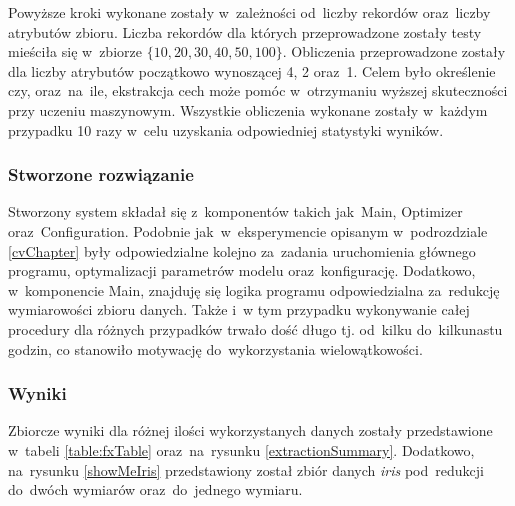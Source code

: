 Powyższe kroki wykonane zostały w~zależności od~liczby rekordów oraz~liczby atrybutów zbioru. Liczba rekordów dla których przeprowadzone zostały testy mieściła się w~zbiorze $ \{10, 20, 30, 40, 50, 100\} $. Obliczenia przeprowadzone zostały dla liczby atrybutów początkowo wynoszącej 4, 2 oraz~1. Celem było określenie czy, oraz~na~ile, ekstrakcja cech może pomóc w~otrzymaniu wyższej skuteczności przy uczeniu maszynowym. Wszystkie obliczenia wykonane zostały w~każdym przypadku 10 razy w~celu uzyskania odpowiedniej statystyki wyników.

\subsubsection{Stworzone rozwiązanie}
Stworzony system składał się z~komponentów takich jak~Main, Optimizer oraz~Configuration. Podobnie jak~w~eksperymencie opisanym w~podrozdziale \ref{cvChapter} były odpowiedzialne kolejno za~zadania uruchomienia głównego programu, optymalizacji parametrów modelu oraz~konfigurację. Dodatkowo, w~komponencie Main, znajduję się logika programu odpowiedzialna za~redukcję wymiarowości zbioru danych. Także i~w tym przypadku wykonywanie całej procedury dla różnych przypadków trwało dość długo tj. od~kilku do~kilkunastu godzin, co stanowiło motywację do~wykorzystania wielowątkowości.

\subsubsection{Wyniki}
Zbiorcze wyniki dla różnej ilości wykorzystanych danych zostały przedstawione w~tabeli \ref{table:fxTable} oraz~na~rysunku \ref{extractionSummary}. Dodatkowo, na~rysunku \ref{showMeIris} przedstawiony został zbiór danych \textit{iris} pod~redukcji do~dwóch wymiarów oraz~do~jednego wymiaru.


